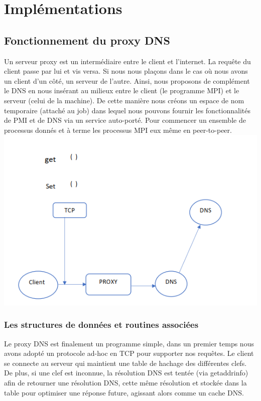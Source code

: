 \documentclass[12pt,a4paper]{article}
\begin{document}
\newpage
\section{Implémentations}

\subsection{Fonctionnement du proxy DNS}

\quad Un serveur proxy est un intermédiaire entre le client et l'internet. La requête du client passe par lui et vis versa. Si nous nous plaçons dans le cas où nous avons un client d'un côté, un serveur de l'autre. Ainsi, nous proposons de complément le DNS en nous insérant au milieux entre le client (le programme MPI) et le serveur (celui de la machine). De cette manière nous créons un espace de nom temporaire (attaché au job) dans lequel nous pouvons fournir les fonctionnalités de PMI et de DNS via un service auto-porté. Pour commencer un ensemble de processus donnés et à terme les processus MPI eux même en peer-to-peer.\\

\includegraphics[scale = 0.5]{figures/Capture.PNG}
\\
\subsubsection{Les structures de données et routines associées}

Le proxy DNS est finalement un programme simple, dans un premier temps nous avons adopté un protocole ad-hoc en TCP pour supporter nos requêtes. Le client se connecte au serveur qui maintient une table de hachage des différentes clefs. De plus, si une clef est inconnue, la résolution DNS est tentée (via getaddrinfo) afin de retourner une résolution DNS, cette même résolution et stockée dans la table pour optimiser une réponse future, agissant alors comme un cache DNS.
\end{document}
